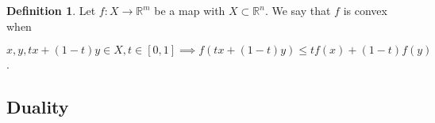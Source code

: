 \documentclass[]{article}
\theoremstyle{definition}
\newtheorem{definition}{Definition}[section]
\theoremstyle{definition}
\newcommand{\raw}{\rightarrow}
\newcommand{\bb}{\mathbb}
\begin{document}
		
		\begin{definition}
			Let $f: X \raw \bb{R}^m$ be a map with $X \subset \bb{R}^n$. We say that $f$ is convex when
			
			\begin{center}
				$x, y, tx + (1-t)y \in X, t \in [0, 1]  \implies f(tx + (1-t)y) \leq tf(x) + (1-t)f(y)$.
			\end{center}
			
		\end{definition}




		\subsection{Duality}
		\subsection{}
	
	
	
	
	
	
\end{document}
